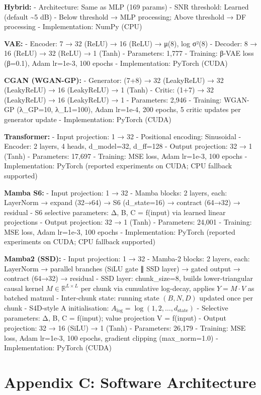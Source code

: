 \textbf{Hybrid:} - Architecture: Same as MLP (169 params) - SNR threshold: Learned (default \textasciitilde5 dB) - Below threshold → MLP processing; Above threshold → DF processing - Implementation: NumPy (CPU)

\textbf{VAE:} - Encoder: 7 → 32 (ReLU) → 16 (ReLU) → μ(8), log σ²(8) - Decoder: 8 → 16 (ReLU) → 32 (ReLU) → 1 (Tanh) - Parameters: 1,777 - Training: β-VAE loss (β=0.1), Adam lr=1e-3, 100 epochs - Implementation: PyTorch (CUDA)

\textbf{CGAN (WGAN-GP):} - Generator: (7+8) → 32 (LeakyReLU) → 32 (LeakyReLU) → 16 (LeakyReLU) → 1 (Tanh) - Critic: (1+7) → 32 (LeakyReLU) → 16 (LeakyReLU) → 1 - Parameters: 2,946 - Training: WGAN-GP (λ\_GP=10, λ\_L1=100), Adam lr=1e-4, 200 epochs, 5 critic updates per generator update - Implementation: PyTorch (CUDA)

\textbf{Transformer:} - Input projection: 1 → 32 - Positional encoding: Sinusoidal - Encoder: 2 layers, 4 heads, d\_model=32, d\_ff=128 - Output projection: 32 → 1 (Tanh) - Parameters: 17,697 - Training: MSE loss, Adam lr=1e-3, 100 epochs - Implementation: PyTorch (reported experiments on CUDA; CPU fallback supported)

\textbf{Mamba S6:} - Input projection: 1 → 32 - Mamba blocks: 2 layers, each: LayerNorm → expand (32→64) → S6 (d\_state=16) → contract (64→32) → residual - S6 selective parameters: Δ, B, C = f(input) via learned linear projections - Output projection: 32 → 1 (Tanh) - Parameters: 24,001 - Training: MSE loss, Adam lr=1e-3, 100 epochs - Implementation: PyTorch (reported experiments on CUDA; CPU fallback supported)

\textbf{Mamba2 (SSD):} - Input projection: 1 → 32 - Mamba-2 blocks: 2 layers, each: LayerNorm → parallel branches (SiLU gate ∥ SSD layer) → gated output → contract (64→32) → residual - SSD layer: chunk\_size=8, builds lower-triangular causal kernel \(M \in \mathbb{R}^{L \times L}\) per chunk via cumulative log-decay, applies \(Y = M \cdot V\) as batched matmul - Inter-chunk state: running state \((B, N, D)\) updated once per chunk - S4D-style A initialisation: \(A_{\log} = \log(1, 2, \dots, d_{\text{state}})\) - Selective parameters: Δ, B, C = f(input); value projection V = f(input) - Output projection: 32 → 16 (SiLU) → 1 (Tanh) - Parameters: 26,179 - Training: MSE loss, Adam lr=1e-3, 100 epochs, gradient clipping (max\_norm=1.0) - Implementation: PyTorch (CUDA)

\section{Appendix C: Software Architecture}\label{sec:appendix-c-software-architecture}

